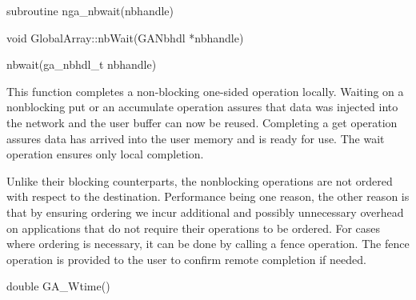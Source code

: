 \documentclass[12pt]{article}
\begin{document}
\begin{fapi}
\begin{fcode}
subroutine nga_nbwait(nbhandle)
\end{fcode}
\begin{funcargs}
\end{funcargs}
\end{fapi}

\begin{cxxapi}
\begin{cxxcode}
void GlobalArray::nbWait(GANbhdl *nbhandle)
\end{cxxcode}
\begin{funcargs}
\end{funcargs}
\end{cxxapi}

\begin{pyapi}
\begin{pycode}
nbwait(ga_nbhdl_t nbhandle) 
\end{pycode}
\end{pyapi} 


\begin{desc}

This function completes a non-blocking one-sided operation locally. Waiting on a nonblocking put or an accumulate operation assures that data was injected into the network and the user buffer can now be reused. Completing a get operation assures data has arrived into the user memory and is ready for use. The wait operation ensures only local completion. 

Unlike their blocking counterparts, the nonblocking operations are not ordered with respect to the destination. Performance being one reason, the other reason is that by ensuring ordering we incur additional and possibly unnecessary overhead on applications that do not require their operations to be ordered. For cases where ordering is necessary, it can be done by calling a fence operation. The fence operation is provided to the user to confirm remote completion if needed.
\end{desc}


\begin{capi}
\begin{ccode}
double GA_Wtime()
\end{ccode}
\end{capi}
\end{document}
